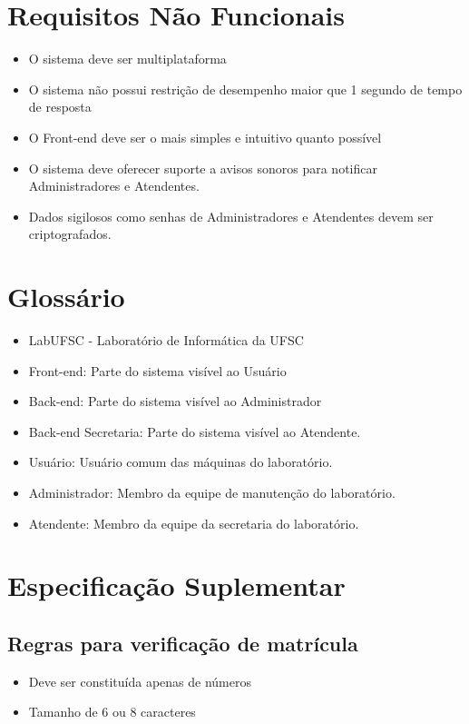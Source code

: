 \documentclass[brazil,times]{abnt}
\begin{document}
\chapter{Requisitos Não Funcionais}
\begin{itemize}
  \item O sistema deve ser multiplataforma
  \item O sistema não possui restrição de desempenho maior que 1 segundo de
  tempo de resposta
  \item O Front-end deve ser o mais simples e intuitivo quanto possível
  \item O sistema deve oferecer suporte a avisos sonoros para notificar
  Administradores e Atendentes.
  \item Dados sigilosos como senhas de Administradores e Atendentes devem ser
  criptografados.
\end{itemize}

\chapter{Glossário}
\begin{itemize}
  \item LabUFSC - Laboratório de Informática da UFSC
  \item Front-end: Parte do sistema visível ao Usuário
  \item Back-end: Parte do sistema visível ao Administrador
  \item Back-end Secretaria: Parte do sistema visível ao Atendente.
  \item Usuário: Usuário comum das máquinas do laboratório.
  \item Administrador: Membro da equipe de manutenção do laboratório.
  \item Atendente: Membro da equipe da secretaria do laboratório.
\end{itemize}

\chapter{Especificação Suplementar}
\section{Regras para verificação de matrícula}
\begin{itemize}
  \item Deve ser constituída apenas de números
  \item Tamanho de 6 ou 8 caracteres
\end{itemize}

%
%
\end{document}
